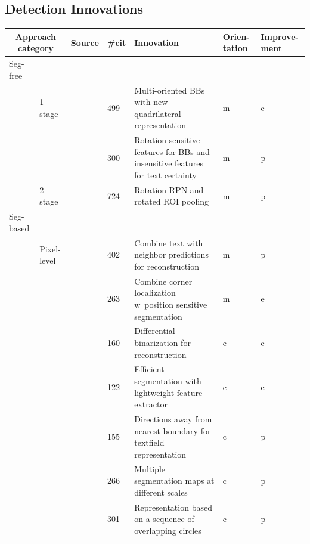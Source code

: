\subsection{Detection Innovations}
\begin{table}[ht]
    \centering\scriptsize
    \begin{tabular}{p{}p{}p{}p{}
            p{}p{}p{}}
    \multicolumn{2}{c}{\textbf{Approach category}} & \textbf{Source} & \textbf{\#cit} &
    \textbf{Innovation} & \textbf{Orien-tation} & \textbf{Improve-ment} \\
        \toprule
        Seg-free & & \\
            & 1-stage &~\cite{liao_textboxes_2018} & 499 & Multi-oriented BBs with
                new quadrilateral representation & m & e\\
            & &~\cite{liao_rotation-sensitive_2018} & 300 & Rotation sensitive features
                for BBs and insensitive features for text certainty & m & p\\
            & 2-stage &~\cite{ma_arbitrary-oriented_2018} & 724 & Rotation RPN and rotated \ac{ROI}
                pooling & m & p\\
        \midrule
        Seg-based & & \\
            & Pixel-level &~\cite{deng_pixellink_2018} & 402 & Combine text with neighbor predictions
                for reconstruction & m & p\\
            & &~\cite{lyu_multi-oriented_2018} & 263 & Combine corner localization w\ position
                sensitive segmentation & m & e \\
            & &~\cite{liao_real-time_2019} & 160 & Differential binarization for
                reconstruction  & c & e \\
            & &~\cite{wang_efficient_2019} & 122 & Efficient segmentation with lightweight feature
                extractor & c & e \\
            & &~\cite{xu_textfield_2019} & 155 & Directions away
                from nearest boundary for textfield representation & c & p \\
            & &~\cite{wang_shape_2019} & 266 & Multiple segmentation maps at different scales
                & c & p\\
            & &~\cite{ferrari_textsnake_2018} & 301 & Representation based on
                a sequence of overlapping circles & c & p \\

\end{tabular}
\end{table}
